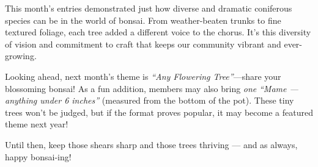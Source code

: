 \noindent
This month's entries demonstrated just how diverse and dramatic coniferous species can be in the world of bonsai. From weather\--beaten trunks to fine textured foliage, each tree added a different voice to the chorus.
It's this diversity of vision and commitment to craft that keeps our community vibrant and ever\--growing.

Looking ahead, next month's theme is \textit{``Any Flowering Tree''}---share your blossoming bonsai!
As a fun addition, members may also bring \textit{one} \textit{``Mame --- anything under 6 inches''} (measured from the bottom of the pot).
These tiny trees won't be judged, but if the format proves popular, it may become a featured theme next year!

Until then, keep those shears sharp and those trees thriving --- and as always, happy bonsai\--ing!
\closearticle
\columnbreak
